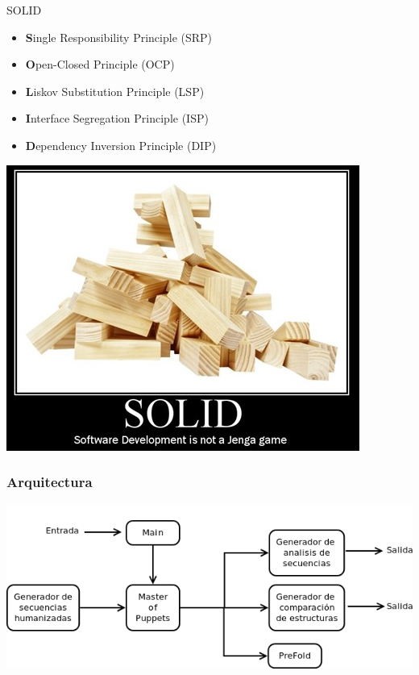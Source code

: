 \begin{frame}
      \begin{block}{SOLID}
      \begin{minipage}{7cm \textwidth}
          \begin{itemize}
            \item   \textbf{S}ingle Responsibility Principle (SRP)
            \item   \textbf{O}pen-Closed Principle (OCP)
            \item   \textbf{L}iskov Substitution Principle (LSP)
            \item   \textbf{I}nterface Segregation Principle (ISP)
            \item   \textbf{D}ependency Inversion Principle (DIP)          
          \end{itemize}            
    \end{minipage}
    \begin{minipage}{3cm}
      \includegraphics[scale=.3]{images/solid.png}
    \end{minipage}     
    \end{block}         
      \end{frame}  

      \begin{frame}\frametitle{\textbf{Arquitectura}}
        \begin{center}
          \includegraphics[scale=.4]{images/componenteRemo.png}
        \end{center}
      \end{frame}  

